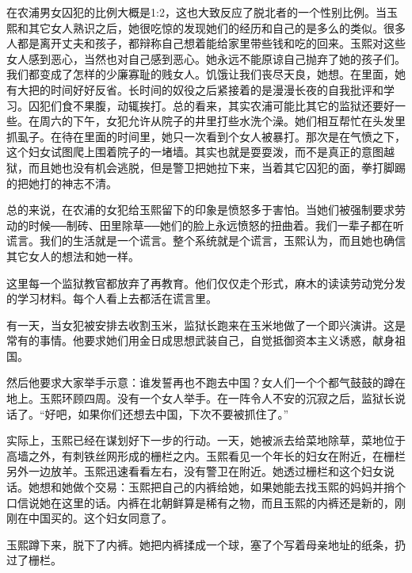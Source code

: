 在农浦男女囚犯的比例大概是1:2，这也大致反应了脱北者的一个性别比例。当玉熙和其它女人熟识之后，她很吃惊的发现她们的经历和自己的是多么的类似。很多人都是离开丈夫和孩子，都辩称自己想着能给家里带些钱和吃的回来。玉熙对这些女人感到恶心，当然也对自己感到恶心。她永远不能原谅自己抛弃了她的孩子们。我们都变成了怎样的少廉寡耻的贱女人。饥饿让我们丧尽天良，她想。在里面，她有大把的时间好好反省。长时间的奴役之后紧接着的是漫漫长夜的自我批评和学习。囚犯们食不果腹，动辄挨打。总的看来，其实农浦可能比其它的监狱还要好一些。在周六的下午，女犯允许从院子的井里打些水洗个澡。她们相互帮忙在头发里抓虱子。在待在里面的时间里，她只一次看到个女人被暴打。那次是在气愤之下，这个妇女试图爬上围着院子的一堵墙。其实也就是耍耍泼，而不是真正的意图越狱，而且她也没有机会逃脱，但是警卫把她拉下来，当着其它囚犯的面，拳打脚踢的把她打的神志不清。

总的来说，在农浦的女犯给玉熙留下的印象是愤怒多于害怕。当她们被强制要求劳动的时候──制砖、田里除草──她们的脸上永远愤怒的扭曲着。我们一辈子都在听谎言。我们的生活就是一个谎言。整个系统就是个谎言，玉熙认为，而且她也确信其它女人的想法和她一样。

这里每一个监狱教官都放弃了再教育。他们仅仅走个形式，麻木的读读劳动党分发的学习材料。每个人看上去都活在谎言里。

有一天，当女犯被安排去收割玉米，监狱长跑来在玉米地做了一个即兴演讲。这是常有的事情。他要求她们用金日成思想武装自己，自觉抵御资本主义诱惑，献身祖国。

然后他要求大家举手示意：谁发誓再也不跑去中国？女人们一个个都气鼓鼓的蹲在地上。玉熙环顾四周。没有一个女人举手。在一阵令人不安的沉寂之后，监狱长说话了。“好吧，如果你们还想去中国，下次不要被抓住了。”

实际上，玉熙已经在谋划好下一步的行动。一天，她被派去给菜地除草，菜地位于高墙之外，有刺铁丝网形成的栅栏之内。玉熙看见一个年长的妇女在附近，在栅栏另外一边放羊。玉熙迅速看看左右，没有警卫在附近。她透过栅栏和这个妇女说话。她想和她做个交易：玉熙把自己的内裤给她，如果她能去找玉熙的妈妈并捎个口信说她在这里的话。内裤在北朝鲜算是稀有之物，而且玉熙的内裤还是新的，刚刚在中国买的。这个妇女同意了。

玉熙蹲下来，脱下了内裤。她把内裤揉成一个球，塞了个写着母亲地址的纸条，扔过了栅栏。
